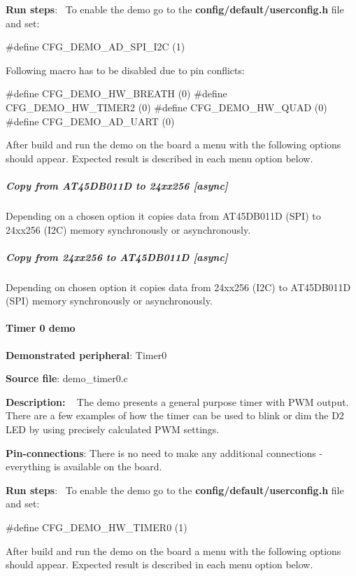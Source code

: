 \begin{DoxyItemize}
\item {\bfseries Run steps}\+:~\newline
 To enable the demo go to the {\bfseries \textquotesingle{}config/default/userconfig.\+h\textquotesingle{}} file and set\+: 
\begin{DoxyCode}
\textcolor{preprocessor}{#define CFG\_DEMO\_AD\_SPI\_I2C  (1)}
\end{DoxyCode}
 Following macro has to be disabled due to pin conflicts\+: 
\begin{DoxyCode}
\textcolor{preprocessor}{#define CFG\_DEMO\_HW\_BREATH   (0)}
\textcolor{preprocessor}{#define CFG\_DEMO\_HW\_TIMER2   (0)}
\textcolor{preprocessor}{#define CFG\_DEMO\_HW\_QUAD     (0)}
\textcolor{preprocessor}{#define CFG\_DEMO\_AD\_UART     (0)}
\end{DoxyCode}
 After build and run the demo on the board a menu with the following options should appear. Expected result is described in each menu option below.
\end{DoxyItemize}

\subparagraph*{Copy from A\+T45\+D\+B011\+D to 24xx256 \mbox{[}async\mbox{]}}

Depending on a chosen option it copies data from A\+T45\+D\+B011\+D (S\+P\+I) to 24xx256 (I2\+C) memory synchronously or asynchronously.

\subparagraph*{Copy from 24xx256 to A\+T45\+D\+B011\+D \mbox{[}async\mbox{]}}

Depending on chosen option it copies data from 24xx256 (I2\+C) to A\+T45\+D\+B011\+D (S\+P\+I) memory synchronously or asynchronously.

\paragraph*{Timer 0 demo}


\begin{DoxyItemize}
\item {\bfseries Demonstrated peripheral}\+: Timer0
\item {\bfseries Source file}\+: demo\+\_\+timer0.\+c
\item {\bfseries Description\+:} ~\newline
 The demo presents a general purpose timer with P\+W\+M output. There are a few examples of how the timer can be used to blink or dim the D2 L\+E\+D by using precisely calculated P\+W\+M settings.
\item {\bfseries Pin-\/connections}\+: There is no need to make any additional connections -\/ everything is available on the board.
\item {\bfseries Run steps}\+:~\newline
 To enable the demo go to the {\bfseries {\ttfamily config/default/userconfig.\+h}} file and set\+: 
\begin{DoxyCode}
\textcolor{preprocessor}{#define CFG\_DEMO\_HW\_TIMER0      (1)}
\end{DoxyCode}
 After build and run the demo on the board a menu with the following options should appear. Expected result is described in each menu option below.
\end{DoxyItemize}

